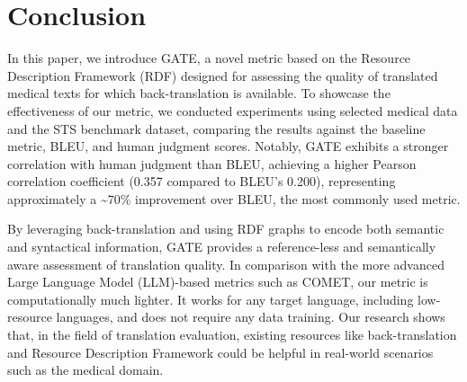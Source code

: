\documentclass[runningheads]{llncs}
\begin{document}



\section{Conclusion}\label{conclusion}


In this paper, we introduce GATE, a novel metric based on the Resource Description Framework (RDF) designed for assessing the quality of translated medical texts for which back-translation is available. To showcase the effectiveness of our metric, we conducted experiments using selected medical data and the STS benchmark dataset, comparing the results against the baseline metric, BLEU, and human judgment scores. Notably, GATE exhibits a stronger correlation with human judgment than BLEU, achieving a higher Pearson correlation coefficient (0.357 compared to BLEU's 0.200), representing approximately a \textasciitilde70\% improvement over BLEU, the most commonly used metric. 

By leveraging back-translation and using RDF graphs to encode both semantic and syntactical information, GATE provides a reference-less and semantically aware assessment of translation quality. In comparison with the more advanced Large Language Model (LLM)-based metrics such as COMET, our metric is computationally much lighter. It works for any target language, including low-resource languages, and does not require any data training. Our research shows that, in the field of translation evaluation, existing resources like back-translation and Resource Description Framework could be helpful in real-world scenarios such as the medical domain.
\end{document}
